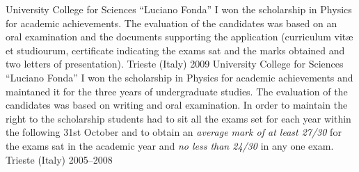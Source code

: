 
\begin{cvhonors}

  \cvhonor
{University College for Sciences ``Luciano Fonda''}
{
   I won the scholarship in Physics for academic achievements.
   The evaluation of the candidates was based on an oral examination and the documents supporting the
   application (curriculum vit\ae{} et studiourum, certificate indicating the
   exams sat and the marks obtained and two letters of presentation).}
{Trieste (Italy)}
{2009}
  \cvhonor
{University College for Sciences ``Luciano Fonda''}
{
   I won the scholarship in Physics for academic achievements and maintaned it
   for the three years of undergraduate studies.
   The evaluation of the candidates was based on writing and oral examination.
   In order to maintain the right to the scholarship students had to sit all
   the exams set for each year within the following 31st October and to obtain
   an \emph{average mark of at least 27/30} for the exams sat in the academic
   year and \emph{no less than 24/30} in any one exam.}
{Trieste (Italy)}
{2005--2008}
\end{cvhonors}











